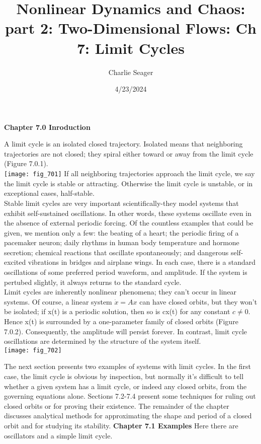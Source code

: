 \documentclass{article}
\newcommand\tab[1][1cm]{\hspace*{#1}}
\begin{document}
\title {Nonlinear Dynamics and Chaos: part 2: Two-Dimensional Flows: Ch 7: Limit Cycles}

\author{Charlie Seager}

\date{4/23/2024}

\maketitle

\textbf {Chapter 7.0 Inroduction}

A limit cycle is an isolated closed trajectory. Isolated means that neighboring trajectories are not closed; they spiral either toward or away from the limit cycle (Figure 7.0.1). \\ 
\texttt{[image: fig\_701]}
If all neighboring trajectories approach the limit cycle, we say the limit cycle is stable or attracting. Otherwise the limit cycle is unstable, or in exceptional cases, half-stable. \\ \tab
Stable limit cycles are very important scientifically-they model systems that exhibit self-sustained oscillations. In other words, these systems oscillate even in the absence of external periodic forcing. Of the countless examples that could be given, we mention only a few: the beating of a heart; the periodic firing of a pacemaker neuron; daily rhythms in human body temperature and hormone secretion; chemical reactions that oscillate spontaneously; and dangerous self-excited vibrations in bridges and airplane wings. In each case, there is a standard oscillations of some preferred period waveform, and amplitude. If the system is pertubed slightly, it always returns to the standard cycle. \\ \tab
Limit cycles are inherently nonlinear phenomena; they can't occur in linear systems. Of course, a linear system $\dot{x}=Ax$ can have closed orbits, but they won't be isolated; if x(t) is a periodic solution, then so is cx(t) for any constant $c \neq 0$. Hence x(t) is surrounded by a one-parameter family of closed orbits (Figure 7.0.2). Consequently, the amplitude will persist forever. In contrast, limit cycle oscillations are determined by the structure of the system itself. \\
\texttt{[image: fig\_702]}

The next section presents two examples of systems with limit cycles. In the first case, the limit cycle is obvious by inspection, but normally it's difficult to tell whether a given system has a limit cycle, or indeed any closed orbits, from the governing equations alone. Sections 7.2-7.4 present some techniques for ruling out closed orbits or for proving their existence. The remainder of the chapter discusses analytical methods for approximating the shape and period of a closed orbit and for studying its stability. 
\textbf {Chapter 7.1 Examples}
Here there are oscillators and a simple limit cycle.
\end{document}
